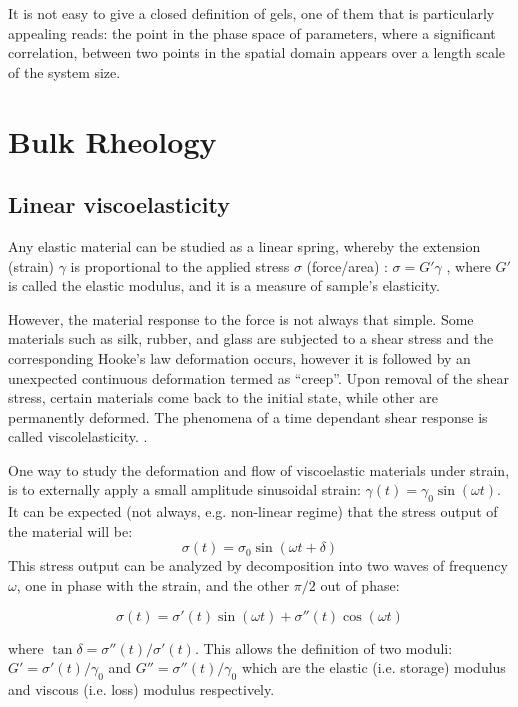 It is not easy to give a closed definition of
gels\citep{gennes_scaling_1979,rubinstein_polymer_2003}, one of them that is particularly appealing reads: the point in the phase space of parameters, where a significant correlation, between two points in the spatial domain appears over a length scale of the system size.

\section{Bulk Rheology}
\subsection{Linear viscoelasticity}
Any elastic material can be studied as a linear spring, whereby the
extension (strain) $\gamma$ is proportional to the applied stress $\sigma$ (force/area) :
$\sigma=G'\gamma$ , where $G'$ is called the elastic modulus, and it is a
measure of sample's elasticity.

However, the material response to the force is not always that simple. Some
materials such as silk, rubber, and glass are subjected to a shear
stress and the corresponding Hooke's law deformation occurs, however it is
followed by an unexpected continuous deformation termed as ``creep''. Upon
removal of the shear stress, certain materials come back to the initial state,
while other are permanently deformed. The phenomena of a time dependant shear
response is called viscolelasticity. \citep{macosko_rheology:_1994}.

One way to study the deformation and flow of viscoelastic materials under
strain, is to externally apply a small amplitude
sinusoidal strain:
$\gamma(t)=\gamma_0\sin(\omega t)$. It can be expected (not always, e.g. non-linear
regime) that the stress output of the material will be:
\begin{equation}\label{viscoelastic-response}
\sigma(t) = \sigma_0 \sin(\omega t + \delta)
\end{equation}
This stress output can be
analyzed by decomposition into two waves of frequency $\omega$, one in phase
with the strain, and the other $\pi/2$ out of phase:

\begin{equation}\label{viscoelastic-stress}
\sigma(t) = \sigma'(t) \sin(\omega t) + \sigma''(t)\cos(\omega t)
\end{equation}

where $ \tan \delta=\sigma''(t)/\sigma'(t)$. This allows the definition of two
moduli: $G'=\sigma'(t)/\gamma_0$ and $G''=\sigma''(t)/\gamma_0$ which are the
elastic (i.e. storage) modulus and viscous (i.e. loss) modulus respectively.

